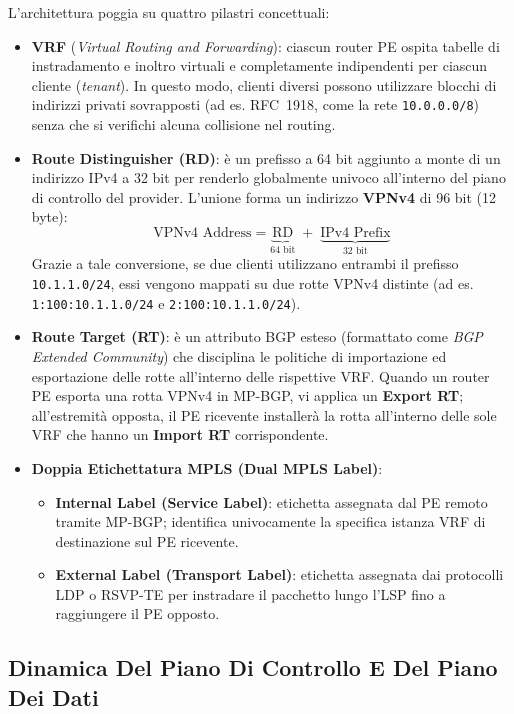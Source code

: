 \documentclass[11pt, a4paper]{article}
\begin{document}
L'architettura poggia su quattro pilastri concettuali:
\begin{itemize}
    \item \textbf{VRF} (\emph{Virtual Routing and Forwarding}): ciascun router PE ospita tabelle di instradamento e inoltro virtuali e completamente indipendenti per ciascun cliente (\emph{tenant}). In questo modo, clienti diversi possono utilizzare blocchi di indirizzi privati sovrapposti (ad es. RFC~1918, come la rete \texttt{10.0.0.0/8}) senza che si verifichi alcuna collisione nel routing.
    \item \textbf{Route Distinguisher (RD)}: è un prefisso a 64 bit aggiunto a monte di un indirizzo IPv4 a 32 bit per renderlo globalmente univoco all'interno del piano di controllo del provider. L'unione forma un indirizzo \textbf{VPNv4} di 96 bit (12 byte):
    \begin{equation}
        \text{VPNv4 Address} = \underbrace{\text{RD}}_{\text{64 bit}} \;+\; \underbrace{\text{IPv4 Prefix}}_{\text{32 bit}}
    \end{equation}
    Grazie a tale conversione, se due clienti utilizzano entrambi il prefisso \texttt{10.1.1.0/24}, essi vengono mappati su due rotte VPNv4 distinte (ad es. \texttt{1:100:10.1.1.0/24} e \texttt{2:100:10.1.1.0/24}).
    \item \textbf{Route Target (RT)}: è un attributo BGP esteso (formattato come \emph{BGP Extended Community}) che disciplina le politiche di importazione ed esportazione delle rotte all'interno delle rispettive VRF. Quando un router PE esporta una rotta VPNv4 in MP-BGP, vi applica un \textbf{Export RT}; all'estremità opposta, il PE ricevente installerà la rotta all'interno delle sole VRF che hanno un \textbf{Import RT} corrispondente.
    \item \textbf{Doppia Etichettatura MPLS (Dual MPLS Label)}:
    \begin{itemize}[noitemsep]
        \item \textbf{Internal Label (Service Label)}: etichetta assegnata dal PE remoto tramite MP-BGP; identifica univocamente la specifica istanza VRF di destinazione sul PE ricevente.
        \item \textbf{External Label (Transport Label)}: etichetta assegnata dai protocolli LDP o RSVP-TE per instradare il pacchetto lungo l'LSP fino a raggiungere il PE opposto.
    \end{itemize}
\end{itemize}

\subsection{Dinamica Del Piano Di Controllo E Del Piano Dei Dati}
\end{document}
